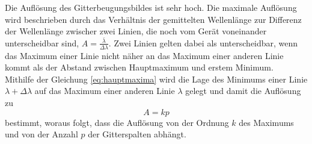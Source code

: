Die Auflösung des Gitterbeugungsbildes ist sehr hoch.
Die maximale Auflösung wird beschrieben durch das Verhältnis der gemittelten Wellenlänge zur Differenz der Wellenlänge
zwischer zwei Linien, die noch vom Gerät voneinander unterscheidbar sind, $A=\frac{\bar\lambda}{\Delta\lambda}$.
Zwei Linien gelten dabei als unterscheidbar, wenn das Maximum einer Linie nicht näher an das Maximum einer anderen Linie kommt als der Abstand zwischen Hauptmaximum und erstem Minimum.\\
Mithilfe der Gleichung \eqref{eq:hauptmaxima} wird die Lage des Minimums einer Linie $\lambda+\Delta\lambda$ auf das Maximum einer anderen Linie $\lambda$ gelegt und damit die Auflösung zu
\begin{equation}
	A=kp
\end{equation}
bestimmt, woraus folgt, dass die Auflösung von der Ordnung $k$ des Maximums und von der Anzahl $p$ der Gitterspalten abhängt.